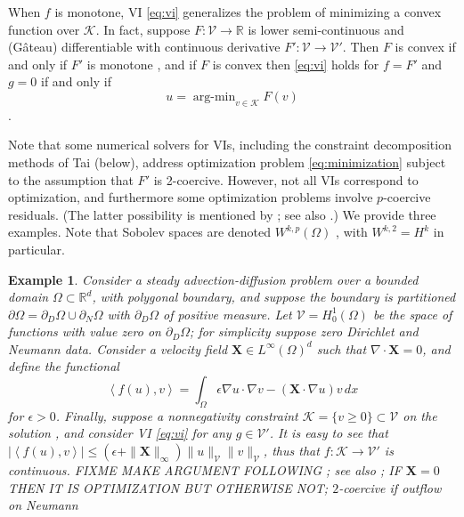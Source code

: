 \documentclass[letterpaper,final,12pt,reqno]{amsart}
\theoremstyle{cstyle}
\theoremstyle{dstyle}
\newtheorem{example}[theorem]{Example}
\numberwithin{equation}{section}
\numberwithin{figure}{section}
\numberwithin{table}{section}
\numberwithin{theorem}{section}
\newcommand{\eps}{\epsilon}
\newcommand{\RR}{\mathbb{R}}
\newcommand{\grad}{\nabla}
\newcommand{\Div}{\nabla\cdot}
\newcommand{\bX}{\mathbf{X}}
\newcommand{\cK}{\mathcal{K}}
\newcommand{\cV}{\mathcal{V}}
\newcommand{\ip}[2]{\left<#1,#2\right>}
\begin{document}
When $f$ is monotone, VI \eqref{eq:vi} generalizes the problem of minimizing a convex function over $\cK$.  In fact, suppose $F:\cV \to \RR$ is lower semi-continuous and (G\^ateau) differentiable with continuous derivative $F':\cV \to \cV'$.  Then $F$ is convex if and only if $F'$ is monotone \cite[Proposition I.5.5]{EkelandTemam1976}, and if $F$ is convex then \eqref{eq:vi} holds for $f=F'$ and $g=0$ if and only if
\begin{equation}
u = \operatorname{arg-min}_{v\in\cK} F(v) \label{eq:minimization}
\end{equation}
\cite[Proposition II.2.1]{EkelandTemam1976}.

Note that some numerical solvers for VIs, including the constraint decomposition methods of Tai \cite{Tai2003} (below), address optimization problem \eqref{eq:minimization} subject to the assumption that $F'$ is 2-coercive.  However, not all VIs correspond to optimization, and furthermore some optimization problems involve $p$-coercive residuals.  (The latter possibility is mentioned by \cite{Tai2003}; see also \cite{TaiXu2002}.)  We provide three examples.  Note that Sobolev spaces are denoted $W^{k,p}(\Omega)$ \cite{Evans2010}, with $W^{k,2}=H^k$ in particular.

\begin{example}  \label{ex:advectiondiffusion}  Consider a steady advection-diffusion problem over a bounded domain $\Omega \subset \RR^d$, with polygonal boundary, and suppose the boundary is partitioned $\partial\Omega = \partial_D\Omega \cup \partial_N\Omega$ with $\partial_D\Omega$ of positive measure.  Let $\cV = H_0^1(\Omega)$ be the space of functions with value zero on $\partial_D\Omega$; for simplicity suppose zero Dirichlet and Neumann data.  Consider a velocity field $\bX \in L^\infty(\Omega)^d$ such that $\Div \bX=0$, and define the functional
\begin{equation}
\ip{f(u)}{v} = \int_\Omega \eps \grad u \cdot \grad v - (\bX \cdot \grad u) v\,dx \label{eq:advectiondiffusion}
\end{equation}
for $\eps>0$.  Finally, suppose a nonnegativity constraint $\cK = \{v\ge 0\} \subset \cV$ on the solution \cite[for example]{ChangNakshatrala2017}, and consider VI \eqref{eq:vi} for any $g\in\cV'$.  It is easy to see that $|\ip{f(u)}{v}| \le (\eps + \|\bX\|_\infty) \|u\|_{\cV} \|v\|_{\cV}$, thus that $f:\cK \to \cV'$ is continuous.  FIXME  MAKE ARGUMENT FOLLOWING \cite{Elmanetal2014}; see also \cite{Kirby2010}; IF $\bX=0$ THEN IT IS OPTIMIZATION BUT OTHERWISE NOT; $2$-coercive if outflow on Neumann
\end{example}
\end{document}
